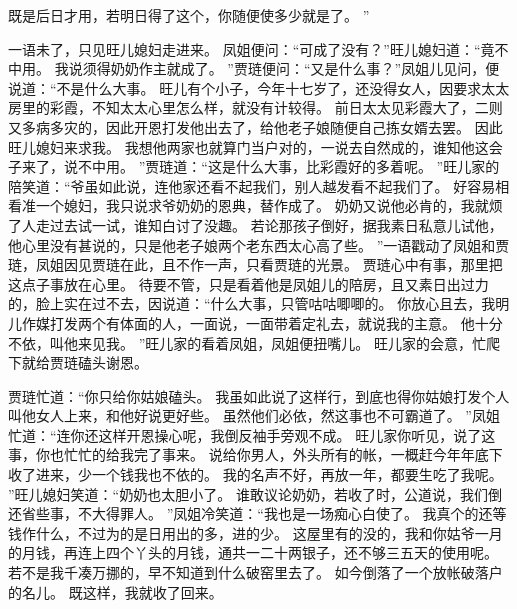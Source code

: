 既是后日才用，若明日得了这个，你随便使多少就是了。
”\par
一语未了，只见旺儿媳妇走进来。
凤姐便问：“可成了没有？”旺儿媳妇道：“竟不中用。
我说须得奶奶作主就成了。
”贾琏便问：“又是什么事？”凤姐儿见问，便说道：“不是什么大事。
旺儿有个小子，今年十七岁了，还没得女人，因要求太太房里的彩霞，不知太太心里怎么样，就没有计较得。
前日太太见彩霞大了，二则又多病多灾的，因此开恩打发他出去了，给他老子娘随便自己拣女婿去罢。
因此旺儿媳妇来求我。
我想他两家也就算门当户对的，一说去自然成的，谁知他这会子来了，说不中用。
”贾琏道：“这是什么大事，比彩霞好的多着呢。
”旺儿家的陪笑道：“爷虽如此说，连他家还看不起我们，别人越发看不起我们了。
好容易相看准一个媳妇，我只说求爷奶奶的恩典，替作成了。
奶奶又说他必肯的，我就烦了人走过去试一试，谁知白讨了没趣。
若论那孩子倒好，据我素日私意儿试他，他心里没有甚说的，只是他老子娘两个老东西太心高了些。
”一语戳动了凤姐和贾琏，凤姐因见贾琏在此，且不作一声，只看贾琏的光景。
贾琏心中有事，那里把这点子事放在心里。
待要不管，只是看着他是凤姐儿的陪房，且又素日出过力的，脸上实在过不去，因说道：“什么大事，只管咕咕唧唧的。
你放心且去，我明儿作媒打发两个有体面的人，一面说，一面带着定礼去，就说我的主意。
他十分不依，叫他来见我。
”旺儿家的看着凤姐，凤姐便扭嘴儿。
旺儿家的会意，忙爬下就给贾琏磕头谢恩。
\par
贾琏忙道：“你只给你姑娘磕头。
我虽如此说了这样行，到底也得你姑娘打发个人叫他女人上来，和他好说更好些。
虽然他们必依，然这事也不可霸道了。
”凤姐忙道：“连你还这样开恩操心呢，我倒反袖手旁观不成。
旺儿家你听见，说了这事，你也忙忙的给我完了事来。
说给你男人，外头所有的帐，一概赶今年年底下收了进来，少一个钱我也不依的。
我的名声不好，再放一年，都要生吃了我呢。
”旺儿媳妇笑道：“奶奶也太胆小了。
谁敢议论奶奶，若收了时，公道说，我们倒还省些事，不大得罪人。
”凤姐冷笑道：“我也是一场痴心白使了。
我真个的还等钱作什么，不过为的是日用出的多，进的少。
这屋里有的没的，我和你姑爷一月的月钱，再连上四个丫头的月钱，通共一二十两银子，还不够三五天的使用呢。
若不是我千凑万挪的，早不知道到什么破窑里去了。
如今倒落了一个放帐破落户的名儿。
既这样，我就收了回来。
